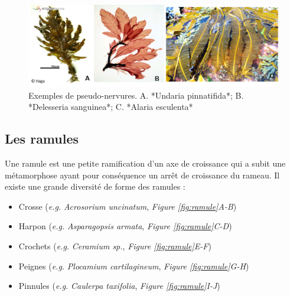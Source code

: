 \documentclass[
]{book}
\providecommand{\tightlist}{%
  \setlength{\itemsep}{0pt}\setlength{\parskip}{0pt}}
\begin{document}
\begin{figure}[H]

{\centering \includegraphics[width=0.7\linewidth]{./images/pseudo_nervure} 

}

\caption{Exemples de pseudo-nervures. A. *Undaria pinnatifida*; B. *Delesseria sanguinea*; C. *Alaria esculenta*}\label{fig:pseudo-nervure}
\end{figure}

\hypertarget{les-ramules}{%
\subsection{Les ramules}\label{les-ramules}}

Une ramule est une petite ramification d'un axe de croissance qui a subit une métamorphose ayant pour conséquence un arrêt de croissance du rameau. Il existe une grande diversité de forme des ramules :

\begin{itemize}
\tightlist
\item
  Crosse (\emph{e.g.} \emph{Acrosorium uncinatum}, \emph{Figure \ref{fig:ramule}A-B})
\item
  Harpon (\emph{e.g.} \emph{Asparagopsis armata}, \emph{Figure \ref{fig:ramule}C-D})
\item
  Crochets (\emph{e.g.} \emph{Ceramium sp.}, \emph{Figure \ref{fig:ramule}E-F})
\item
  Peignes (\emph{e.g.} \emph{Plocamium cartilagineum}, \emph{Figure \ref{fig:ramule}G-H})
\item
  Pinnules (\emph{e.g.} \emph{Caulerpa taxifolia}, \emph{Figure \ref{fig:ramule}I-J})
\end{itemize}
\end{document}
